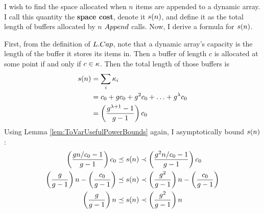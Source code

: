 I wish to find the space allocated when $n$ items are appended to a dynamic array. I call this quantity the \textbf{space cost}, denote it $s(n)$, and define it as the total length of buffers allocated by $n$ $Append$ calls. Now, I derive a formula for $s(n)$.

First, from the definition of $L.Cap$, note that a dynamic array's capacity is the length of the buffer it stores its items in. Then a buffer of length $c$ is allocated at some point if and only if $c \in \kappa$. Then the total length of those buffers is
\begin{align*}
s(n) &= \sum_i {\kappa_i}\\
&= c_0 + gc_0 + g^2c_0 + \ldots + g^\lambda c_0\\
&= \left( \frac{g^{\lambda + 1} - 1}{g - 1} \right) c_0
\end{align*}
Using Lemma \ref{lem:ToVarUsefulPowerBounds} again, I asymptotically bound $s(n)$:
\begin{align*}
\left( \frac{g{n} / c_0 - 1}{g - 1} \right) c_0 \preceq s(n) &\prec \left( \frac{g^2{n} / c_0 - 1}{g - 1} \right) c_0\\
\left( \frac{g}{g - 1} \right) n - \left( \frac{c_0}{g - 1} \right) \preceq s(n) &\prec \left( \frac{g^2}{g - 1} \right) n - \left( \frac{c_0}{g - 1} \right)\\
\left( \frac{g}{g - 1} \right) n \preceq s(n) &\prec \left( \frac{g^2}{g - 1} \right) n
\end{align*}